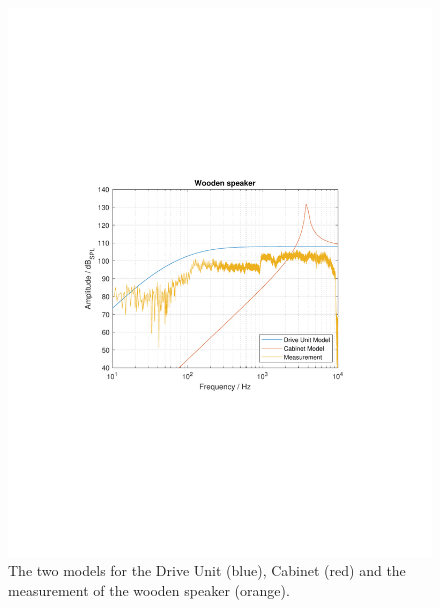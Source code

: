 \begin{figure}
	\centering
	\includegraphics[width=0.7\linewidth, clip, trim={3.9cm 8.4cm 4.5cm 8.5cm}]{gfx/Results/AllCompareWooden.pdf}
	\caption{The two models for the Drive Unit (blue), Cabinet (red) and the measurement of the wooden speaker (orange).}
	\label{fig:allcomparewooden}
\end{figure}

\FloatBarrier